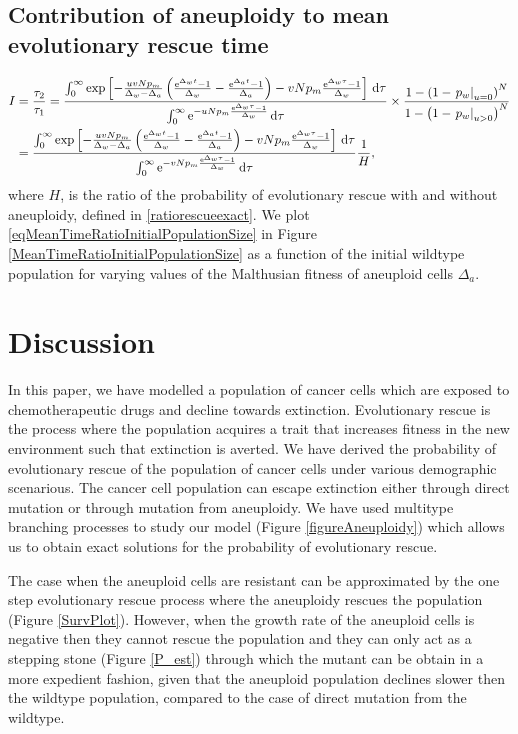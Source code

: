 \documentclass[12pt]{extarticle}
\renewcommand{\d}{{\rm d}}
\newcommand{\e}{{\rm e}}
\begin{document}
\subsection*{Contribution of aneuploidy to mean evolutionary rescue time}
\begin{align}\nonumber
I&=\frac{\tau_2}{\tau_1}=\frac{\int_0^\infty\exp\left[-\frac{uvNp_m}{\Delta_w-\Delta_a}\left(\frac{\e^{\Delta_wt}-1}{\Delta_w}-\frac{\e^{\Delta_at}-1}{\Delta_a}\right)-vNp_m\frac{\e^{\Delta_w\tau}-1}{\Delta_w}\right]\,\d\tau}{\int_0^\infty\e^{-uNp_m\frac{\e^{\Delta_w\tau}-1}{\Delta_w}}\,\d\tau}\times\frac{1-\left(1-\left.p_w\right|_{u=0}\right)^N}{1-\left(1-\left.p_w\right|_{u>0}\right)^N}\\\label{eqMeanTimeRatioInitialPopulationSize}
&=\frac{\int_0^\infty\exp\left[-\frac{uvNp_m}{\Delta_w-\Delta_a}\left(\frac{\e^{\Delta_wt}-1}{\Delta_w}-\frac{\e^{\Delta_at}-1}{\Delta_a}\right)-vNp_m\frac{\e^{\Delta_w\tau}-1}{\Delta_w}\right]\,\d\tau}{\int_0^\infty\e^{-vNp_m\frac{\e^{\Delta_w\tau}-1}{\Delta_w}}\,\d\tau}\frac{1}{H},
\end{align}
where $H$, is the ratio of the probability of evolutionary rescue with and without aneuploidy, defined in \eqref{ratiorescueexact}. We plot \eqref{eqMeanTimeRatioInitialPopulationSize} in Figure \ref{MeanTimeRatioInitialPopulationSize} as a function of the initial wildtype population for varying values of the Malthusian fitness of aneuploid cells $\Delta_a$.

\section*{Discussion}

In this paper, we have modelled a population of cancer cells which are exposed to chemotherapeutic drugs and decline towards extinction. Evolutionary rescue  is the process where the population acquires a trait that increases fitness in the new environment such that extinction is averted. We have derived the probability of evolutionary rescue of the population of cancer cells under various demographic scenarious. The cancer cell population can escape extinction either through direct mutation or through mutation from aneuploidy. We have used multitype branching processes to study our model (Figure \ref{figureAneuploidy}) which allows us to obtain exact solutions for the probability of evolutionary rescue.

The case when the aneuploid cells are resistant can be approximated by the one step evolutionary rescue process where the aneuploidy rescues the population (Figure \ref{SurvPlot}). However, when the growth rate of the aneuploid cells is negative then they cannot rescue the population and they can only act as a stepping stone (Figure \ref{P_est}) through which the mutant can be obtain in a more expedient fashion, given that the aneuploid population declines slower then the wildtype population, compared to the case of direct mutation from the wildtype. 
\end{document}
